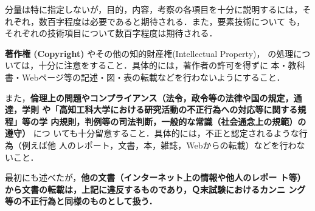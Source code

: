 分量は特に指定しないが，目的，内容，考察の各項目を十分に説明するには，そ
れぞれ，数百字程度は必要であると期待される．また，要素技術について
も，それぞれの技術項目について数百字程度は期待される．

\textbf{著作権 (Copyright)} やその他の知的財産権(Intellectual Property)，
の処理については，十分に注意をすること．具体的には，著作者の許可を得ずに
本・教科書・Webページ等の記述・図・表の転載などを行わないようにすること．

また，\textbf{倫理上の問題やコンプライアンス（法令，政令等の法律や国の規定，通達，学則
や「高知工科大学における研究活動の不正行為への対応等に関する規程」等の学
内規則，判例等の司法判断，一般的な常識（社会通念上の規範）の遵守）} につ
いても十分留意すること．具体的には，不正と認定されるような行為（例えば他
人のレポート，文書，本，雑誌，Webからの転載）などを行わないこと．

最初にも述べたが，\textbf{他の文書（インターネット上の情報や他人のレポー
ト等）から文書の転載は，上記に違反するものであり，Ｑ末試験におけるカンニ
ング等の不正行為と同様のものとして扱う．}

